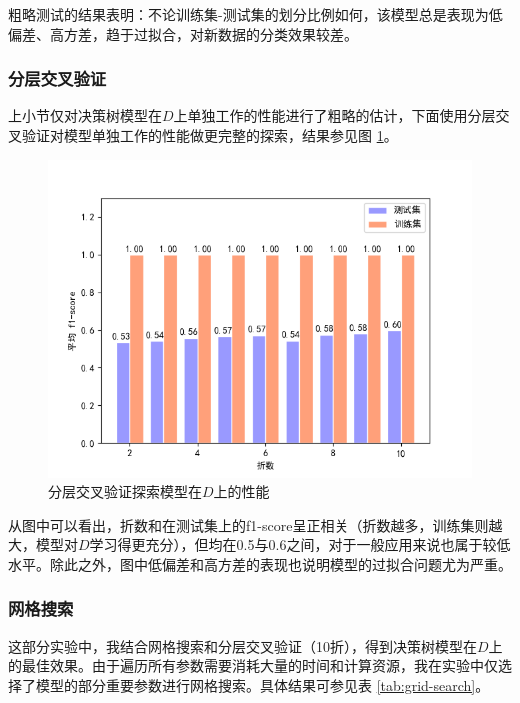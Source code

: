 \documentclass[12pt,a4paper]{article}
\theoremstyle{definition}
\begin{document}
粗略测试的结果表明：不论训练集-测试集的划分比例如何，该模型总是表现为低偏差、高方差，趋于过拟合，对新数据的分类效果较差。

\subsubsection{分层交叉验证}

上小节仅对决策树模型在$D$上单独工作的性能进行了粗略的估计，下面使用分层交叉验证对模型单独工作的性能做更完整的探索，结果参见图 \ref{fig:cv_bar}。

\begin{figure}[H]
	\centering
	\includegraphics[width=0.8\linewidth]{img/cv_bar.png}
	\caption{分层交叉验证探索模型在$D$上的性能}
	\label{fig:cv_bar}
\end{figure}

从图中可以看出，折数和在测试集上的f1-score呈正相关（折数越多，训练集则越大，模型对$D$学习得更充分），但均在0.5与0.6之间，对于一般应用来说也属于较低水平。除此之外，图中低偏差和高方差的表现也说明模型的过拟合问题尤为严重。

\subsubsection{网格搜索}

这部分实验中，我结合网格搜索和分层交叉验证（10折），得到决策树模型在$D$上的最佳效果。由于遍历所有参数需要消耗大量的时间和计算资源，我在实验中仅选择了模型的部分重要参数进行网格搜索。具体结果可参见表 \ref{tab:grid-search}。
\end{document}
